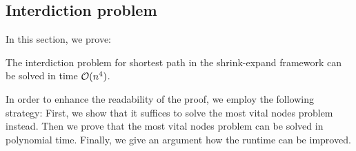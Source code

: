 \subsection{Interdiction problem}
In this section, we prove: 

\begin{theorem}
\label{thm:shortest_path_interdiction}
The interdiction problem for shortest path in the shrink-expand framework can be solved in time $\mathcal{O}(n^4)$.
\end{theorem}

In order to enhance the readability of the proof, we employ the following strategy: First, we show that it suffices to solve the most vital nodes problem instead. Then we prove that the most vital nodes problem can be solved in polynomial time. Finally, we give an argument how the runtime can be improved.

